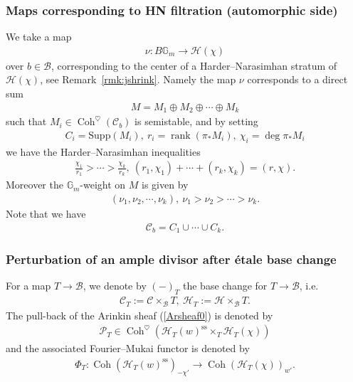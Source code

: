 \documentclass[11pt,oneside,a4paper,mathscr]{amsart}
\theoremstyle{definition}
\newcommand{\cH}{\mathcal{H}}
\newcommand{\cB}{\mathcal{B}}
\newcommand{\cC}{\mathcal{C}}
\newcommand{\cP}{\mathcal{P}}
\newcommand{\bgm}{B\mathbb{G}_m}
\newcommand{\Coh}{\operatorname{Coh}}
\begin{document}
\subsubsection*{Maps corresponding to HN filtration (automorphic side)}
We take a map 
\begin{align}\label{nu:F12}
    \nu \colon \bgm \to \cH(\chi)
\end{align}
over $b\in \cB$, 
corresponding to the center of a Harder--Narasimhan stratum of $\cH(\chi)$, 
see Remark~\ref{rmk:jshrink}. 
Namely the map $\nu$ corresponds to a direct sum 
\begin{align*}
    M=M_1\oplus M_2 \oplus \cdots \oplus M_k
\end{align*}
such that $M_i\in \Coh^{\heartsuit}(\cC_b)$ is semistable, and by setting 
\begin{align}\label{Ci}
    C_i=\mathrm{Supp}(M_i), \ r_i=\operatorname{rank}(\pi_{*}M_i), \ \chi_i=\deg \pi_{*}M_i
\end{align}
we have the Harder--Narasimhan inequalities
\begin{align}\label{slope:rchi}
    \frac{\chi_1}{r_1}>\cdots>\frac{\chi_k}{r_k}, \ (r_1, \chi_1)+\cdots+(r_k, \chi_k)=(r, \chi).
\end{align}
Moreover the $\mathbb{G}_m$-weight on $M$ is given by 
\begin{align*}(\nu_1, \nu_2, \cdots, \nu_k), \ \nu_1>\nu_2>\cdots>\nu_k. 
\end{align*}
Note that we have 
\begin{align*}
    \cC_b=C_1 \cup \cdots \cup C_k. 
\end{align*}

\subsubsection*{Perturbation of an ample divisor after \'{e}tale base change}
For a map $T\to \cB$, we denote by $(-)_T$ the base change for $T\to \cB$, i.e.\ 
\begin{align*}\cC_T:=\cC\times_{\cB}T, \ 
\cH_T:=\cH\times_{\cB} T.
\end{align*}
The pull-back of the Arinkin sheaf (\ref{Arsheaf0}) is denoted by 
\begin{align}\label{P:pullT}
    \cP_T \in \Coh^{\heartsuit}(\cH_T(w)^{\mathrm{ss}} \times_T \cH_T(\chi))
\end{align}
and the associated Fourier--Mukai functor is denoted by 
\begin{align*}
    \Phi_T \colon \Coh(\cH_T(w)^{\mathrm{ss}})_{-\chi'} \to \Coh(\cH_T(\chi))_{w'}.
\end{align*}
\end{document}
